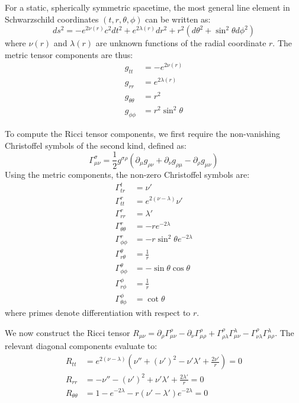 For a static, spherically symmetric spacetime, the most general line element in Schwarzschild coordinates $(t, r, \theta, \phi)$ can be written as:
\begin{equation}
ds^2 = -e^{2\nu(r)} c^2 dt^2 + e^{2\lambda(r)} dr^2 + r^2(d\theta^2 + \sin^2\theta d\phi^2)
\end{equation}
where $\nu(r)$ and $\lambda(r)$ are unknown functions of the radial coordinate $r$. The metric tensor components are thus:
\begin{align}
g_{tt} &= -e^{2\nu(r)} \\
g_{rr} &= e^{2\lambda(r)} \\
g_{\theta\theta} &= r^2 \\
g_{\phi\phi} &= r^2 \sin^2\theta
\end{align}

To compute the Ricci tensor components, we first require the non-vanishing Christoffel symbols of the second kind, defined as:
\begin{equation}
\Gamma^\sigma_{\mu\nu} = \frac{1}{2} g^{\sigma\rho} \left( \partial_\mu g_{\rho\nu} + \partial_\nu g_{\rho\mu} - \partial_\rho g_{\mu\nu} \right)
\end{equation}
Using the metric components, the non-zero Christoffel symbols are:
\begin{align}
\Gamma^t_{tr} &= \nu' \\
\Gamma^r_{tt} &= e^{2(\nu - \lambda)} \nu' \\
\Gamma^r_{rr} &= \lambda' \\
\Gamma^r_{\theta\theta} &= -r e^{-2\lambda} \\
\Gamma^r_{\phi\phi} &= -r \sin^2\theta e^{-2\lambda} \\
\Gamma^\theta_{r\theta} &= \frac{1}{r} \\
\Gamma^\theta_{\phi\phi} &= -\sin\theta \cos\theta \\
\Gamma^\phi_{r\phi} &= \frac{1}{r} \\
\Gamma^\phi_{\theta\phi} &= \cot\theta
\end{align}
where primes denote differentiation with respect to $r$. 

We now construct the Ricci tensor $R_{\mu\nu} = \partial_\rho \Gamma^\rho_{\mu\nu} - \partial_\nu \Gamma^\rho_{\mu\rho} + \Gamma^\rho_{\rho\lambda}\Gamma^\lambda_{\mu\nu} - \Gamma^\rho_{\nu\lambda}\Gamma^\lambda_{\mu\rho}$. The relevant diagonal components evaluate to:
\begin{align}
R_{tt} &= e^{2(\nu-\lambda)} \left( \nu'' + (\nu')^2 - \nu'\lambda' + \frac{2\nu'}{r} \right) = 0 \label{eq:Rtt} \\
R_{rr} &= -\nu'' - (\nu')^2 + \nu'\lambda' + \frac{2\lambda'}{r} = 0 \label{eq:Rrr} \\
R_{\theta\theta} &= 1 - e^{-2\lambda} - r(\nu' - \lambda')e^{-2\lambda} = 0 \label{eq:Rtheta}
\end{align}

